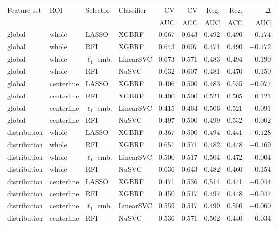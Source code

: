{\footnotesize\setlength{\tabcolsep}{3pt}%
\begin{tabular}{llllrrrrr}
\toprule
Feature set & ROI & Selector & Classifier & CV & CV & Reg. & Reg. & $\Delta$ \\
 &  &  &  & AUC & ACC & AUC & ACC & AUC \\
\midrule
global       & whole      & LASSO         & XGBRF     & 0.667 & 0.643 & 0.492 & 0.490 & $-0.174$ \\
global       & whole      & RFI           & XGBRF     & 0.643 & 0.607 & 0.471 & 0.490 & $-0.172$ \\
global       & whole      & $\ell_1$ emb. & LinearSVC & 0.673 & 0.571 & 0.483 & 0.494 & $-0.190$ \\
global       & whole      & RFI           & NuSVC     & 0.632 & 0.607 & 0.481 & 0.470 & $-0.150$ \\
\midrule
global       & centerline & LASSO         & XGBRF     & 0.406 & 0.500 & 0.483 & 0.535 & $+0.077$ \\
global       & centerline & RFI           & XGBRF     & 0.400 & 0.500 & 0.521 & 0.505 & $+0.121$ \\
global       & centerline & $\ell_1$ emb. & LinearSVC & 0.415 & 0.464 & 0.506 & 0.521 & $+0.091$ \\
global       & centerline & RFI           & NuSVC     & 0.497 & 0.500 & 0.499 & 0.532 & $+0.002$ \\
\midrule
distribution & whole      & LASSO         & XGBRF     & 0.367 & 0.500 & 0.494 & 0.441 & $+0.128$ \\
distribution & whole      & RFI           & XGBRF     & 0.651 & 0.571 & 0.482 & 0.448 & $-0.169$ \\
distribution & whole      & $\ell_1$ emb. & LinearSVC & 0.500 & 0.517 & 0.504 & 0.472 & $+0.004$ \\
distribution & whole      & RFI           & NuSVC     & 0.636 & 0.643 & 0.482 & 0.460 & $-0.154$ \\
\midrule
distribution & centerline & LASSO         & XGBRF     & 0.471 & 0.536 & 0.514 & 0.441 & $+0.044$ \\
distribution & centerline & RFI           & XGBRF     & 0.450 & 0.517 & 0.497 & 0.448 & $+0.047$ \\
distribution & centerline & $\ell_1$ emb. & LinearSVC & 0.559 & 0.517 & 0.499 & 0.550 & $-0.060$ \\
distribution & centerline & RFI           & NuSVC     & 0.536 & 0.571 & 0.502 & 0.440 & $-0.034$ \\
\bottomrule
\end{tabular}}
